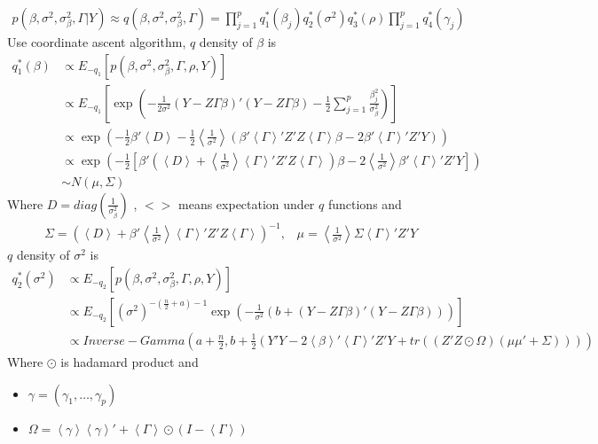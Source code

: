 \documentclass[11pt]{article}
\begin{document}
	
	\begin{align*}
	p(\beta,\sigma^2,\sigma_\beta^2,\Gamma | Y) \approx q(\beta,\sigma^2,\sigma_\beta^2,\Gamma) = \prod_{j=1}^{p}q_1^*(\beta_j)q_2^*(\sigma^2) q_3^*(\rho)\prod_{j=1}^{p}q_4^*(\gamma_j)
	\end{align*}
	Use coordinate ascent algorithm, $q$ density of $\beta$ is
	\begin{align*}
	q_1^*(\beta) &\propto E_{-q_1}\left[p(\beta,\sigma^2,\sigma_\beta^2,\Gamma , \rho,Y)\right]\\
	&\propto E_{-q_1}\left[\exp\left(-\frac{1}{2\sigma^2}\left(Y - Z\Gamma\beta\right)'\left(Y-Z\Gamma\beta\right) - \frac{1}{2}\sum_{j=1}^{p}\frac{\beta_j^2}{\sigma_{\beta}^2}\right)\right]\\
	&\propto \exp\left(-\frac{1}{2} \beta'\left<D\right> -\frac{1}{2}\left<\frac{1}{\sigma^2}\right>\left(\beta'\left<\Gamma\right>'Z'Z\left<\Gamma\right>\beta- 2\beta'\left<\Gamma\right>'Z'Y\right)\right)\\
	&\propto \exp\left(-\frac{1}{2}\left[\beta'\left(\left<D\right> + \left<\frac{1}{\sigma^2}\right>\left<\Gamma\right>'Z'Z\left<\Gamma\right>\right)\beta -2 \left<\frac{1}{\sigma^2}\right>\beta'\left<\Gamma\right>'Z'Y\right]\right)\\
	&\sim N(\mu,\Sigma)
	\end{align*}
	Where $D = diag(\frac{1}{\sigma_{\beta}^2})$ , $<>$ means expectation under $q$ functions and
	\begin{align*}
	\Sigma = \left(\left<D\right> +\beta' \left<\frac{1}{\sigma^2}\right>\left<\Gamma\right>'Z'Z\left<\Gamma\right>\right)^{-1},\;\;\;\mu = \left<\frac{1}{\sigma^2}\right> \Sigma  \left<\Gamma\right>'Z'Y
	\end{align*}
	$q$ density of $\sigma^2$ is
	\begin{align*}
	q_2^*(\sigma^2) &\propto E_{-q_2}\left[p(\beta,\sigma^2,\sigma_\beta^2,\Gamma, \rho , Y)\right]\\
	&\propto E_{-q_2}\left[\left(\sigma^2\right)^{-\left(\frac{n}{2}+a\right)-1}\exp \left(-\frac{1}{\sigma^2}\left(b+\left(Y-Z\Gamma\beta\right)'\left(Y-Z\Gamma\beta\right)\right)\right) \right]\\
	&\propto Inverse-Gamma\left(a+\frac{n}{2}, b+\frac{1}{2}\left(Y'Y - 2\left<\beta\right>'\left<\Gamma\right>'Z'Y + tr\left(\left(Z'Z \odot \Omega\right)\left(\mu \mu'+ \Sigma\right)\right) \right)\right)
	\end{align*}
	Where $\odot$ is hadamard product and
	\begin{itemize}
		\item $\gamma = (\gamma_1,\dots,\gamma_p)$
		\item $\Omega = \left<\gamma\right>\left<\gamma\right>' + \left<\Gamma\right>\odot(I - \left<\Gamma\right>)$
	\end{itemize}
\end{document}
